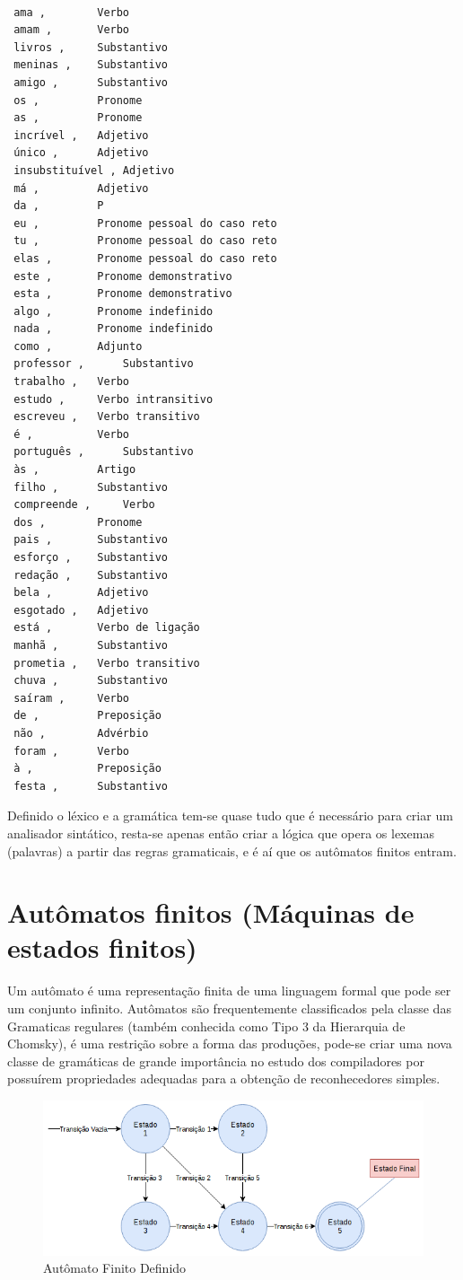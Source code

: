 \documentclass[12pt,a4paper,oneside,english,brazilian,brazil]{abntex2}
\begin{document}
\setlength{\parindent}{0cm}
\hrulefill
\setlength{\parindent}{1.25cm}
\begin{verbatim}

 ama ,		  Verbo 
 amam ,		  Verbo 
 livros ,	  Substantivo 
 meninas ,	  Substantivo 
 amigo ,	  Substantivo 
 os ,		  Pronome 
 as ,		  Pronome 
 incrível ,	  Adjetivo 
 único ,	  Adjetivo 
 insubstituível , Adjetivo 
 má ,		  Adjetivo 
 da ,		  P 
 eu ,		  Pronome pessoal do caso reto 
 tu ,		  Pronome pessoal do caso reto 
 elas ,		  Pronome pessoal do caso reto 
 este ,		  Pronome demonstrativo 
 esta ,		  Pronome demonstrativo 
 algo ,		  Pronome indefinido 
 nada ,		  Pronome indefinido 
 como ,		  Adjunto 
 professor ,	  Substantivo 
 trabalho ,	  Verbo 
 estudo ,	  Verbo intransitivo 
 escreveu ,	  Verbo transitivo 
 é ,		  Verbo 
 português ,	  Substantivo 
 às ,		  Artigo 
 filho ,	  Substantivo 
 compreende ,	  Verbo 
 dos ,		  Pronome 
 pais ,		  Substantivo 
 esforço ,	  Substantivo 
 redação ,	  Substantivo 
 bela ,		  Adjetivo 
 esgotado ,	  Adjetivo 
 está ,		  Verbo de ligação 
 manhã ,	  Substantivo 
 prometia ,	  Verbo transitivo 
 chuva ,	  Substantivo 
 saíram ,	  Verbo 
 de ,		  Preposição 
 não ,		  Advérbio 
 foram ,	  Verbo 
 à ,		  Preposição 
 festa ,	  Substantivo 
\end{verbatim}
\setlength{\parindent}{0cm}
\hrulefill
\setlength{\parindent}{1.25cm}


\par Definido o léxico e a gramática tem-se quase tudo que é necessário para criar um analisador sintático, resta-se apenas então criar a lógica que opera os lexemas (palavras) a partir das regras gramaticais, e é aí que os autômatos finitos entram.

\section{Autômatos finitos (Máquinas de estados finitos)}

\par Um autômato é uma representação finita de uma linguagem formal que pode ser um conjunto infinito. Autômatos são frequentemente classificados pela classe das Gramaticas regulares (também conhecida como Tipo 3 da Hierarquia de Chomsky), é uma restrição sobre a forma das produções, pode-se criar uma nova classe de gramáticas de grande importância no estudo dos compiladores por possuírem propriedades adequadas para a obtenção de reconhecedores simples.\

\begin{figure}[H]
\centering
\includegraphics[scale=0.7]{Imagens/automatos.png}
\caption{Autômato Finito Definido}
\end{figure}
\end{document}
